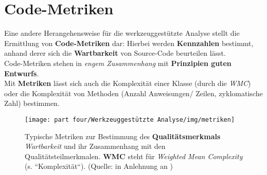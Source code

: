 \section{Code-Metriken}

\begin{tcolorbox}[title=Code-Metriken]
    Eine andere Herangehensweise für die werkzeuggestützte Analyse stellt die Ermittlung von \textbf{Code-Metriken} dar: Hierbei werden \textbf{Kennzahlen} bestimmt, anhand derer sich die \textbf{Wartbarkeit} von Source-Code beurteilen lässt.\\
    Code-Metriken stehen in \textit{engem Zusammenhang} mit \textbf{Prinzipien guten Entwurfs}.\\

    \noindent
    Mit \textbf{Metriken} lässt sich auch die Komplexität einer Klasse (durch die \textit{WMC}) oder die Komplexität von Methoden (Anzahl Anweisungen/ Zeilen, zyklomatische Zahl) bestimmen.
\end{tcolorbox}
\vspace{2mm}

\begin{figure}
    \centering
    \texttt{[image: part four/Werkzeuggestützte Analyse/img/metriken]}
    \caption{Typische Metriken zur Bestimmung des \textbf{Qualitätsmerkmals} \textit{Wartbarkeit} und ihr Zusammenhang mit den Qualitätsteilmerkmalen. \textbf{WMC} steht für  \textit{Weighted Mean Complexity} (s. ``Komplexität``). (Quelle: in Anlehnung an \cite[Abb. 4.3, 37]{Wed09c})}
    \label{fig:metriken-cc}
\end{figure}